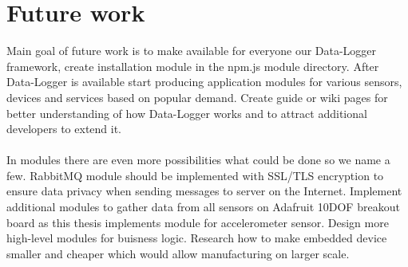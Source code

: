 \section{Future work} %
\label{sec:future_work}
Main goal of future work is to make available for everyone our Data-Logger framework, create installation module in the npm.js module directory. After Data-Logger is available start producing application modules for various sensors, devices and services based on popular demand. Create guide or wiki pages for better understanding of how Data-Logger works and to attract additional developers to extend it.\\\\
In modules there are even more possibilities what could be done so we name a few. RabbitMQ module should be implemented with SSL/TLS encryption to ensure data privacy when sending messages to server on the Internet. Implement additional modules to gather data from all sensors on Adafruit 10DOF breakout board as this thesis implements module for accelerometer sensor. Design more high-level modules for buisness logic. Research how to make embedded device smaller and cheaper which would allow manufacturing on larger scale.
